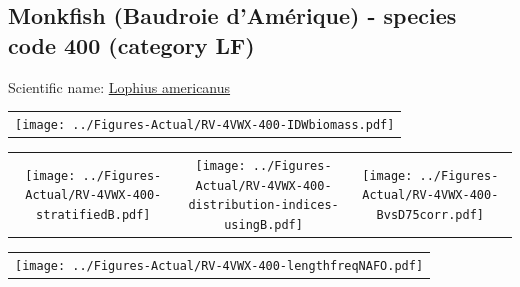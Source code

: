 \documentclass[12pt]{article}\usepackage[]{graphicx}\usepackage[]{color}
\begin{document}
\renewcommand\thefigure{\thesubsection\Alph{figure}}

\setcounter{figure}{0}

\hypertarget{sec:400}{%
\subsection{Monkfish (Baudroie d'Amérique) - species code 400 (category LF)}\label{sec:400}}

  


Scientific name: \href{http://www.marinespecies.org/aphia.php?p=taxdetails\&id=159184}{Lophius americanus} \newline
\begin{minipage}{1.0\textwidth}
 \begin{tabular}{c}
\texttt{[image: ../Figures-Actual/RV-4VWX-400-IDWbiomass.pdf]} \\ 
\end{tabular} 
\end{minipage}
\newline

\vspace{1cm}
\begin{minipage}{1.0\textwidth}
 \begin{tabular}{ccc}
\texttt{[image: ../Figures-Actual/RV-4VWX-400-stratifiedB.pdf]} & 
\texttt{[image: ../Figures-Actual/RV-4VWX-400-distribution-indices-usingB.pdf]} & 
\texttt{[image: ../Figures-Actual/RV-4VWX-400-BvsD75corr.pdf]} \\ 
\end{tabular} 
\end{minipage}
\clearpage
\begin{minipage}{1.0\textwidth}
 \begin{tabular}{c}
\texttt{[image: ../Figures-Actual/RV-4VWX-400-lengthfreqNAFO.pdf]} \\ 
\end{tabular} 
\end{minipage}
\newline
\end{document}
